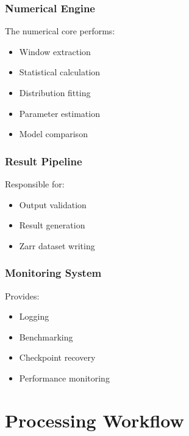 \documentclass[11pt,a4paper]{article}
\begin{document}
\subsubsection{Numerical Engine}


The numerical core performs:


\begin{itemize}

\item Window extraction
\item Statistical calculation
\item Distribution fitting
\item Parameter estimation
\item Model comparison

\end{itemize}



\subsubsection{Result Pipeline}


Responsible for:


\begin{itemize}

\item Output validation
\item Result generation
\item Zarr dataset writing

\end{itemize}



\subsubsection{Monitoring System}


Provides:


\begin{itemize}

\item Logging
\item Benchmarking
\item Checkpoint recovery
\item Performance monitoring

\end{itemize}



\section{Processing Workflow}
\end{document}
